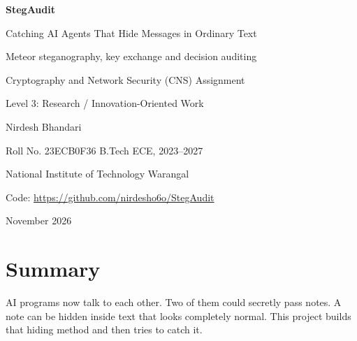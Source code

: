 \documentclass[11pt,a4paper]{article}
\newcommand{\repourl}{https://github.com/nirdesho6o/StegAudit}
\newcommand{\repolink}{\expandafter\url\expandafter{\repourl}}
\begin{document}

\begin{titlepage}
\centering
\vspace*{2cm}
{\LARGE\bfseries StegAudit\par}
\vspace{0.4cm}
{\Large Catching AI Agents That Hide Messages in Ordinary Text\par}
\vspace{0.6cm}
{\large Meteor steganography, key exchange and decision auditing\par}
\vspace{2cm}
{\large Cryptography and Network Security (CNS) Assignment\par}
\vspace{0.3cm}
{\large Level 3: Research / Innovation-Oriented Work\par}
\vspace{2cm}
{\large Nirdesh Bhandari\par}
Roll No. 23ECB0F36 \quad B.Tech ECE, 2023--2027\par
National Institute of Technology Warangal\par
\vspace{1cm}
Code: \repolink\par
\vfill
{\large November 2026\par}
\end{titlepage}

\section*{Summary}
AI programs now talk to each other. Two of them could secretly pass notes.
A note can be hidden inside text that looks completely normal.
This project builds that hiding method and then tries to catch it.
\end{document}
